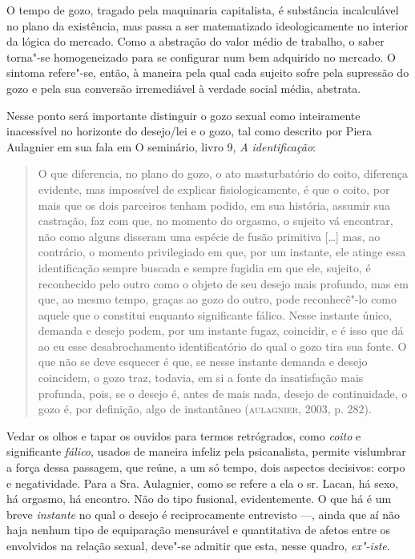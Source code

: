 O tempo de gozo, tragado pela maquinaria capitalista, é substância
incalculável no plano da existência, mas passa a ser matematizado
ideologicamente no interior da lógica do mercado. Como a abstração do
valor médio de trabalho, o saber torna"-se homogeneizado para se
configurar num bem adquirido no mercado. O sintoma refere"-se, então, à
maneira pela qual cada sujeito sofre pela supressão do gozo e pela sua
conversão irremediável à verdade social média, abstrata.

Nesse ponto será importante distinguir o gozo sexual como inteiramente
inacessível no horizonte do desejo/lei e o gozo, tal como descrito por
Piera Aulagnier em sua fala em O seminário, livro 9, \emph{A
identificação}:

\begin{quote}
O que diferencia, no plano do gozo, o ato masturbatório do coito,
diferença evidente, mas impossível de explicar fisiologicamente, é que o
coito, por mais que os dois parceiros tenham podido, em sua história,
assumir sua castração, faz com que, no momento do orgasmo, o sujeito vá
encontrar, não como alguns disseram uma espécie de fusão primitiva
{[}\ldots{}{]} mas, ao contrário, o momento privilegiado em que, por um
instante, ele atinge essa identificação sempre buscada e sempre fugidia
em que ele, sujeito, é reconhecido pelo outro como o objeto de seu
desejo mais profundo, mas em que, ao mesmo tempo, graças ao gozo do
outro, pode reconhecê"-lo como aquele que o constitui enquanto
significante fálico. Nesse instante único, demanda e desejo podem, por
um instante fugaz, coincidir, e é isso que dá ao eu esse desabrochamento
identificatório do qual o gozo tira sua fonte. O que não se deve
esquecer é que, se nesse instante demanda e desejo coincidem, o gozo
traz, todavia, em si a fonte da insatisfação mais profunda, pois, se o
desejo é, antes de mais nada, desejo de continuidade, o gozo é, por
definição, algo de instantâneo (\textsc{aulagnier}, 2003, p. 282).
\end{quote}

Vedar os olhos e tapar os ouvidos para termos retrógrados, como
\emph{coito} e significante \emph{fálico}, usados de maneira infeliz
pela psicanalista, permite vislumbrar a força dessa passagem, que reúne,
a um só tempo, dois aspectos decisivos: corpo e negatividade. Para a
Sra. Aulagnier, como se refere a ela o sr. Lacan, há sexo, há orgasmo,
há encontro. Não do tipo fusional, evidentemente. O que há é um breve
\emph{instante} no qual o desejo é reciprocamente entrevisto ---, ainda
que aí não haja nenhum tipo de equiparação mensurável e quantitativa de
afetos entre os envolvidos na relação sexual, deve"-se admitir que esta,
nesse quadro, \emph{ex"-iste}.

